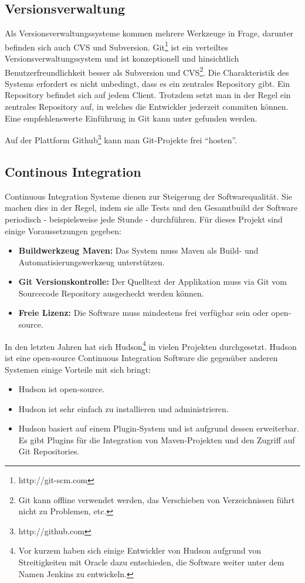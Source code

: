 \subsection{Versionsverwaltung}
Als Versionsverwaltungssysteme kommen mehrere Werkzeuge in Frage, darunter befinden sich auch CVS und Subversion. Git\footnote{http://git-scm.com} ist ein verteiltes Versionsverwaltungssystem und ist konzeptionell und hinsichtlich Benutzerfreundlichkeit besser als Subversion und CVS\footnote{Git kann offline verwendet werden, das Verschieben von Verzeichnissen führt nicht zu Problemen, etc.}. Die Charakteristik des Systems erfordert es nicht unbedingt, dass es ein zentrales Repository gibt. Ein Repository befindet sich auf jedem Client. Trotzdem setzt man in der Regel ein zentrales Repository auf, in welches die Entwickler jederzeit commiten können. Eine empfehlenswerte Einführung in Git kann unter \cite{dilger201111}  gefunden werden.

Auf der Plattform Github\footnote{http://github.com} kann man Git-Projekte frei ``hosten''.




\subsection{Continous Integration}
Continuous Integration Systeme dienen zur Steigerung der Softwarequalität. Sie machen dies in der Regel, indem sie alle Tests und den Gesamtbuild der Software periodisch - beispielsweise jede Stunde - durchführen. Für dieses Projekt sind einige Voraussetzungen gegeben:
\begin{itemize}
	\item \textbf{Buildwerkzeug Maven:} Das System muss Maven als Build- und Automatisierungswerkzeug unterstützen.
	\item \textbf{Git Versionskontrolle:} Der Quelltext der Applikation muss via Git vom Sourcecode Repository ausgecheckt werden können.
	\item \textbf{Freie Lizenz:} Die Software muss mindestens frei verfügbar sein oder open-source.
\end{itemize}
In den letzten Jahren hat sich Hudson\footnote{Vor kurzem haben sich einige Entwickler von Hudson aufgrund von Streitigkeiten mit Oracle dazu entschieden, die Software weiter unter dem Namen Jenkins zu entwickeln.} in vielen Projekten durchgesetzt. Hudson ist eine open-source Continuous Integration Software die gegenüber anderen Systemen einige Vorteile mit sich bringt:
\begin{itemize}
\item Hudson ist open-source.
\item Hudson ist sehr einfach zu installieren und administrieren.
\item Hudson basiert auf einem Plugin-System und ist aufgrund dessen erweiterbar. Es gibt Plugins für die Integration von Maven-Projekten und den Zugriff auf Git Repositories.
\end{itemize}

